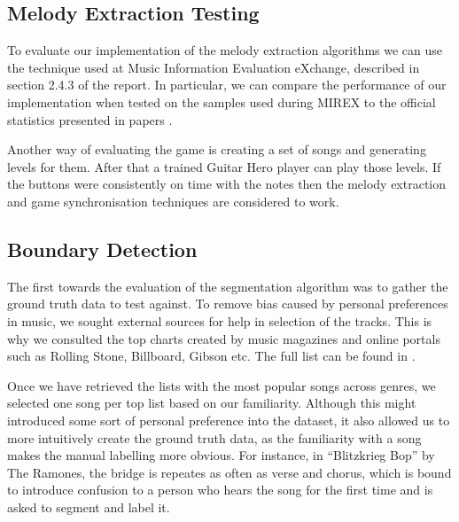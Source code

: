 \subsection{Melody Extraction Testing}
To evaluate our implementation of the melody extraction algorithms we can use the technique used at Music Information Evaluation eXchange, described in section 2.4.3 of the report. In particular, we can compare the performance of our implementation when tested on the samples used during MIREX to the official statistics presented in papers \cite{salamon, comparison}.

Another way of evaluating the game is creating a set of songs and generating levels for them. After that a trained Guitar Hero player can play those levels. If the buttons were consistently on time with the notes then the melody extraction and game synchronisation techniques are considered to work.


\subsection{Boundary Detection}

The first towards the evaluation of the segmentation algorithm was to gather the ground truth data to test against. To remove bias caused by personal preferences in music, we sought external sources for help in selection of the tracks. This is why we consulted the top charts created by music magazines and online portals such as Rolling Stone, Billboard, Gibson etc. The full list can be found in \cite{toplists}.

Once we have retrieved the lists with the most popular songs across genres, we selected one song per top list based on our familiarity. Although this might introduced some sort of personal preference into the dataset, it also allowed us to more intuitively create the ground truth data, as the familiarity with a song makes the manual labelling more obvious. For instance, in “Blitzkrieg Bop” by The Ramones, the bridge is repeates as often as verse and chorus, which is bound to introduce confusion to a person who hears the song for the first time and is asked to segment and label it.


